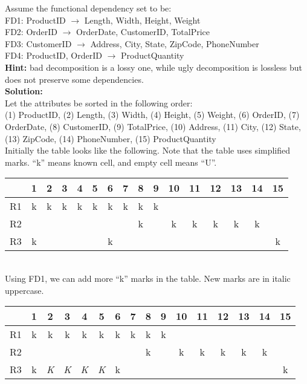 \begin{enumerate}
\vspace*{-0.5em}

Assume the functional dependency set to be:\\
FD1: ProductID  $\rightarrow$ Length, Width, Height, Weight\\
FD2: OrderID $\rightarrow$ OrderDate, CustomerID, TotalPrice\\
FD3: CustomerID $\rightarrow$ Address, City, State, ZipCode, PhoneNumber\\
FD4: ProductID, OrderID $\rightarrow$ ProductQuantity\\

\textbf{Hint:} bad decomposition is a lossy one, while ugly decomposition is lossless but does not preserve some dependencies.\\

\textbf{Solution:} \\

Let the attributes be sorted in the following order: \\
(1) ProductID, (2) Length, (3) Width, (4) Height, (5) Weight, (6) OrderID, (7) OrderDate, (8) CustomerID, (9) TotalPrice, (10) Address, (11) City, (12) State, (13) ZipCode, (14) PhoneNumber, (15) ProductQuantity\\

Initially the table looks like the following. Note that the table uses simplified marks. ``k'' means known cell, and empty cell means ``U''.

\begin{tabular}{|c|c|c|c|c|c|c|c|c|c|c|c|c|c|c|c|}
\hline 
& 1 & 2 & 3 & 4 & 5 & 6 & 7 & 8 & 9 & 10 & 11 & 12 & 13 & 14 & 15 \\ 
\hline 
R1 & k & k & k & k & k & k & k & k & k &  &  &  &  &  &  \\ 
\hline 
R2 &  &  &  &  &  &  &  & k &  & k & k & k & k & k &  \\ 
\hline 
R3 & k &  &  &  &  & k &  &  &  &  &  &  &  &  & k \\ 
\hline 
\end{tabular} \\

Using FD1, we can add more ``k'' marks in the table. New marks are in italic uppercase.

\begin{tabular}{|c|c|c|c|c|c|c|c|c|c|c|c|c|c|c|c|}
\hline 
& 1 & 2 & 3 & 4 & 5 & 6 & 7 & 8 & 9 & 10 & 11 & 12 & 13 & 14 & 15 \\ 
\hline 
R1 & k & k & k & k & k & k & k & k & k &  &  &  &  &  &  \\ 
\hline 
R2 &  &  &  &  &  &  &  & k &  & k & k & k & k & k &  \\ 
\hline 
R3 & k & \textit{K} & \textit{K} & \textit{K} & \textit{K} & k &  &  &  &  &  &  &  &  & k \\ 
\hline 
\end{tabular} \\


\end{enumerate}
